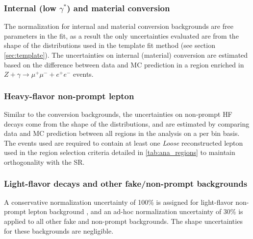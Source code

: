 \documentclass[../thesis.tex]{subfiles}
\begin{document}

\subsubsection*{Internal (low $\gamma^{*}$) and material conversion}
The normalization for internal and material conversion backgrounds are free parameters in the fit, as a result the only uncertainties evaluated are from the shape of the distributions used in the template fit method (see section \ref{sec:template}). The uncertainties on internal (material) conversion are estimated based on the difference between data and \acs{MC} prediction in a region enriched in $Z+\gamma \rightarrow \mu^+\mu^- + e^+e^-$ events.

\subsubsection*{Heavy-flavor non-prompt lepton}
Similar to the conversion backgrounds, the uncertainties on non-prompt \acs{HF} decays come from the shape of the distributions, and are estimated by comparing data and \acs{MC} prediction between all regions in the analysis on a per bin basis. The events used are required to contain at least one \textit{Loose} reconstructed lepton used in the region selection criteria detailed in \autoref{tab:ana_regions} to maintain orthogonality with the \acs{SR}.

\subsubsection*{Light-flavor decays and other fake/non-prompt backgrounds}
A conservative normalization uncertainty of 100\% is assigned for light-flavor non-prompt lepton background \citep{bg:ttH_ttW_ML}, and an ad-hoc normalization uncertainty of 30\% is applied to all other fake and non-prompt backgrounds. The shape uncertainties for these backgrounds are negligible.
\end{document}
